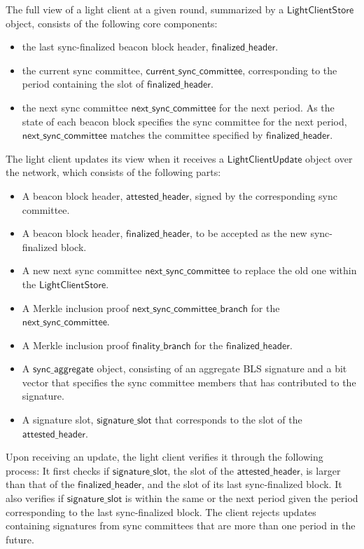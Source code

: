 The full view of a light client at a given round, summarized by a $\mathsf{LightClientStore}$ object, 
consists of the following core components:
\begin{itemize}
    \item the last sync-finalized beacon block header, $\mathsf{finalized\_header}$.
    \item the current sync committee, $\mathsf{current\_sync\_committee}$, corresponding to the period
    containing the slot of $\mathsf{finalized\_header}$.
    \item the next sync committee $\mathsf{next\_sync\_committee}$ for the next period. 
    As the state of each beacon block specifies the sync committee for the next period,
    $\mathsf{next\_sync\_committee}$ matches the committee specified by $\mathsf{finalized\_header}$. 
\end{itemize}

The light client updates its view when it receives a $\mathsf{LightClientUpdate}$ object over the network, 
which consists of the following parts: 
\begin{itemize}
    \item A beacon block header, $\mathsf{attested\_header}$, signed by the corresponding sync committee.
    \item A beacon block header, $\mathsf{finalized\_header}$, to be accepted as the new sync-finalized block.
    \item A new next sync committee $\mathsf{next\_sync\_committee}$ to replace the old one within the $\mathsf{LightClientStore}$.
    \item A Merkle inclusion proof $\mathsf{next\_sync\_committee\_branch}$ for the $\mathsf{next\_sync\_committee}$.
    \item A Merkle inclusion proof $\mathsf{finality\_branch}$ for the $\mathsf{finalized\_header}$.
    \item A $\mathsf{sync\_aggregate}$ object, consisting of an aggregate BLS signature and a bit vector that specifies
    the sync committee members that has contributed to the signature.
    \item A signature slot, $\mathsf{signature\_slot}$ that corresponds to the slot of the $\mathsf{attested\_header}$.
\end{itemize}

Upon receiving an update, the light client verifies it through the following process:
It first checks if $\mathsf{signature\_slot}$, the slot of the $\mathsf{attested\_header}$,
is larger than that of the $\mathsf{finalized\_header}$, and the slot of its last sync-finalized block.
It also verifies if $\mathsf{signature\_slot}$ is within the same or the next period given the period 
corresponding to the last sync-finalized block.
The client rejects updates containing signatures from sync committees that are more than one period in the future.

